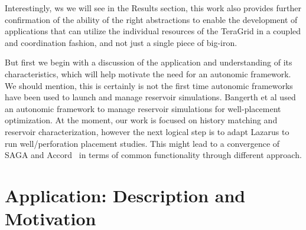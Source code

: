 \documentclass[conference,final]{IEEEtran}
\newcommand{\jhanote}[1]{ {\textcolor{red} { ***Jha: #1 }}}
\newcommand{\jhanote}[1]{}
\begin{document}

Interestingly, ws we will see in the Results section, this work also
provides further confirmation of the ability of the right abstractions
to enable the development of applications that can utilize the
individual resources of the TeraGrid in a coupled and coordination
fashion, and not just a single piece of big-iron.

But first we begin with a discussion of the application and
understanding of its characteristics, which will help motivate the
need for an autonomic framework. We should mention, this is certainly
is not the first time autonomic frameworks have been used to launch
and manage reservoir simulations. Bangerth et al \cite{Manish} used an
autonomic framework to manage reservoir simulations for well-placement
optimization. At the moment, our work is focused on history matching
and reservoir characterization, however the next logical step is to
adapt Lazarus to run well/perforation placement studies. This might
lead to a convergence of SAGA and Accord~\cite{accord} in terms of
common functionality through different approach.



\section{Application: Description and Motivation} 
\end{document}
